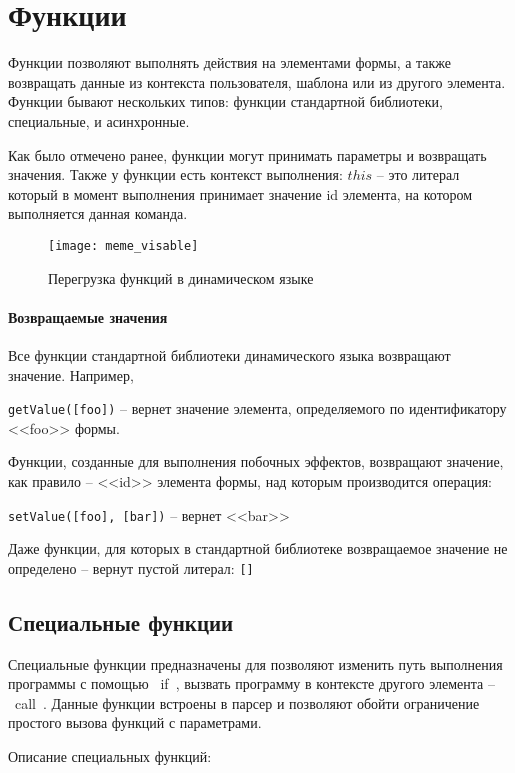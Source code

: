 \documentclass[../index.tex]{subfiles}
\begin{document}
\label{sec:functions}
\section{Функции}

Функции позволяют выполнять действия на элементами формы, а также 
возвращать данные из контекста пользователя, шаблона или из другого элемента. 
Функции бывают нескольких типов: функции стандартной библиотеки, специальные, и асинхронные.

Как было отмечено ранее, функции могут принимать параметры и возвращать значения. 
Также у функции есть контекст выполнения: $this$ -- это литерал который в момент выполнения принимает значение id 
элемента, на котором выполняется данная команда.

\begin{figure}[h]
	\texttt{[image: meme\_visable]}
	\centering
	\caption{Перегрузка функций в динамическом языке}
\end{figure}

\paragraph{Возвращаемые значения}

Все функции стандартной библиотеки динамического языка возвращают значение. Например,

\verb|getValue([foo])| -- вернет значение элемента, определяемого по идентификатору <<foo>> формы.

Функции, созданные для выполнения побочных эффектов, возвращают значение, как правило -- <<id>> элемента формы, над которым производится операция:

\verb|setValue([foo], [bar])| -- вернет <<bar>>

Даже функции, для которых в стандартной библиотеке возвращаемое значение не определено -- вернут пустой литерал: \verb|[]|


\subsection{Специальные функции}
Специальные функции предназначены для позволяют изменить путь выполнения программы с помощью ~if~, 
вызвать программу в контексте другого элемента -- ~call~.
Данные функции встроены в парсер и позволяют обойти ограничение простого вызова функций с параметрами.

Описание специальных функций:

\label{p:if}
\end{document}
